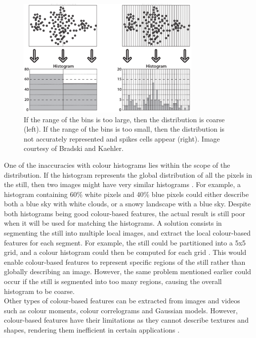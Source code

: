 \begin{figure}[h]
\centerline{\includegraphics[width=0.80\textwidth]{figures/histogram_bin_size.png}}
\caption{\label{fig:histogram-bin-size}If the range of the bins is too large, then the distribution is coarse (left). If the range of the bins is too small, then the distribution is not accurately represented and spikes cells appear (right). Image courtesy of Bradski and Kaehler.}
\end{figure}

One of the inaccuracies with colour histograms lies within the scope of the distribution. If the histogram represents the global distribution of all the pixels in the still, then two images might have very similar histograms \cite{petkovic2000}. For example, a histogram containing 60\% white pixels and 40\% blue pixels could either describe both a blue sky with white clouds, or a snowy landscape with a blue sky. Despite both histograms being good colour-based features, the actual result is still poor when it will be used for matching the histograms. A solution consists in segmenting the still into multiple local images, and extract the local colour-based features for each segment. For example, the still could be partitioned into a 5x5 grid, and a colour histogram could then be computed for each grid \cite{yan2007review}. This would enable colour-based features to represent specific regions of the still rather than globally describing an image. However, the same problem mentioned earlier could occur if the still is segmented into too many regions, causing the overall histogram to be coarse.\\

Other types of colour-based features can be extracted from images and videos such as colour moments, colour correlograms \cite{huang1997correlograms} and Gaussian models. However, colour-based features have their limitations as they cannot describe textures and shapes, rendering them inefficient in certain applications \cite{hu2011survey}.

